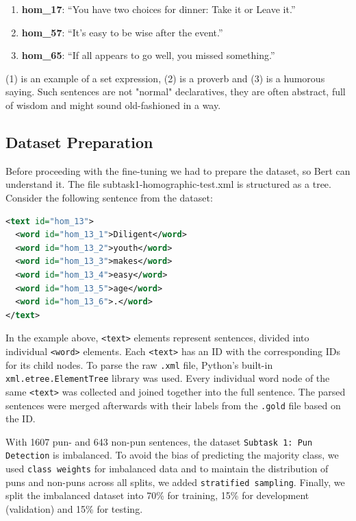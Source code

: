\documentclass[11pt,a4paper]{article}
\begin{document}
\begin{enumerate}
    \item[(1)] \textbf{hom\_17}: ``You have two choices for dinner: Take it or Leave it.'' 
    \item[(2)] \textbf{hom\_57}: ``It’s easy to be wise after the event.'' 
    \item[(3)] \textbf{hom\_65}: ``If all appears to go well, you missed something.'' 
\end{enumerate}

(1) is an example of a set expression, (2) is a proverb and (3) is a humorous saying. Such sentences are not "normal" declaratives, they are often abstract, full of wisdom and might sound old-fashioned in a way. %

\subsection{Dataset Preparation}

Before proceeding with the fine-tuning we had to prepare the dataset, so Bert can understand it. The file subtask1-homographic-test.xml is structured as a tree. Consider the following sentence from the dataset:
\begin{footnotesize}
\begin{lstlisting}[language=XML, xleftmargin=10pt]
<text id="hom_13">
  <word id="hom_13_1">Diligent</word>
  <word id="hom_13_2">youth</word>
  <word id="hom_13_3">makes</word>
  <word id="hom_13_4">easy</word>
  <word id="hom_13_5">age</word>
  <word id="hom_13_6">.</word>
</text>
\end{lstlisting}
\end{footnotesize}
In the example above, 
\texttt{\textless text\textgreater} elements represent sentences, divided into individual 
\texttt{\textless word\textgreater} elements. 
Each \texttt{\textless text\textgreater} has an ID with the corresponding IDs for its child nodes. 
To parse the raw \texttt{.xml} file, Python's built-in \texttt{xml.etree.ElementTree} library was used. Every individual word node of the same \texttt{\textless text\textgreater} was collected and joined together into the full sentence. The parsed sentences were merged afterwards with their labels from the \texttt{.gold} file based on the ID.


With 1607 pun- and 643 non-pun sentences, the dataset \texttt{Subtask 1: Pun Detection} is imbalanced. To avoid the bias of predicting the majority class, we used \texttt{class weights} for imbalanced data and to maintain the distribution of puns and non-puns across all splits, we added \texttt{stratified sampling}. Finally, we split the imbalanced dataset into 70\% for training, 15\% for development (validation) and 15\% for testing.
\end{document}
